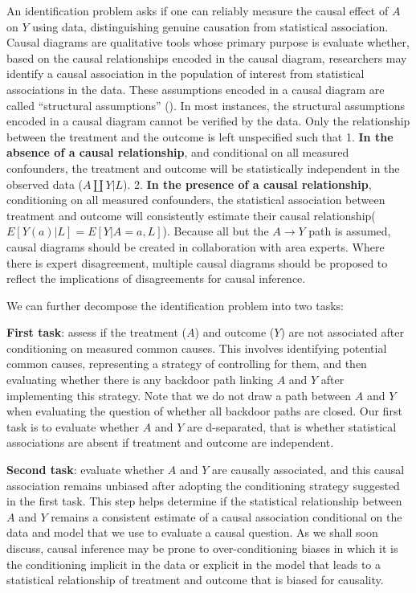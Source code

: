 \documentclass[
  singlecolumn]{article}
\begin{document}
An identification problem asks if one can reliably measure the causal
effect of \(A\) on \(Y\) using data, distinguishing genuine causation
from statistical association. Causal diagrams are qualitative tools
whose primary purpose is evaluate whether, based on the causal
relationships encoded in the causal diagram, researchers may identify a
causal association in the population of interest from statistical
associations in the data. These assumptions encoded in a causal diagram
are called ``structural assumptions''
(). In most
instances, the structural assumptions encoded in a causal diagram cannot
be verified by the data. Only the relationship between the treatment and
the outcome is left unspecified such that 1. \textbf{In the absence of a
causal relationship}, and conditional on all measured confounders, the
treatment and outcome will be statistically independent in the observed
data (\(A \coprod Y| L\)). 2. \textbf{In the presence of a causal
relationship}, conditioning on all measured confounders, the statistical
association between treatment and outcome will consistently estimate
their causal relationship(\(E[Y(a) | L] = E[Y |A=a, L]\)). Because all
but the \(A\to Y\) path is assumed, causal diagrams should be created in
collaboration with area experts. Where there is expert disagreement,
multiple causal diagrams should be proposed to reflect the implications
of disagreements for causal inference.

We can further decompose the identification problem into two tasks:

\textbf{First task}: assess if the treatment (\(A\)) and outcome (\(Y\))
are not associated after conditioning on measured common causes. This
involves identifying potential common causes, representing a strategy of
controlling for them, and then evaluating whether there is any backdoor
path linking \(A\) and \(Y\) after implementing this strategy. Note that
we do not draw a path between \(A\) and \(Y\) when evaluating the
question of whether all backdoor paths are closed. Our first task is to
evaluate whether \(A\) and \(Y\) are d-separated, that is whether
statistical associations are absent if treatment and outcome are
independent.

\textbf{Second task}: evaluate whether \(A\) and \(Y\) are causally
associated, and this causal association remains unbiased after adopting
the conditioning strategy suggested in the first task. This step helps
determine if the statistical relationship between \(A\) and \(Y\)
remains a consistent estimate of a causal association conditional on the
data and model that we use to evaluate a causal question. As we shall
soon discuss, causal inference may be prone to over-conditioning biases
in which it is the conditioning implicit in the data or explicit in the
model that leads to a statistical relationship of treatment and outcome
that is biased for causality.
\end{document}
